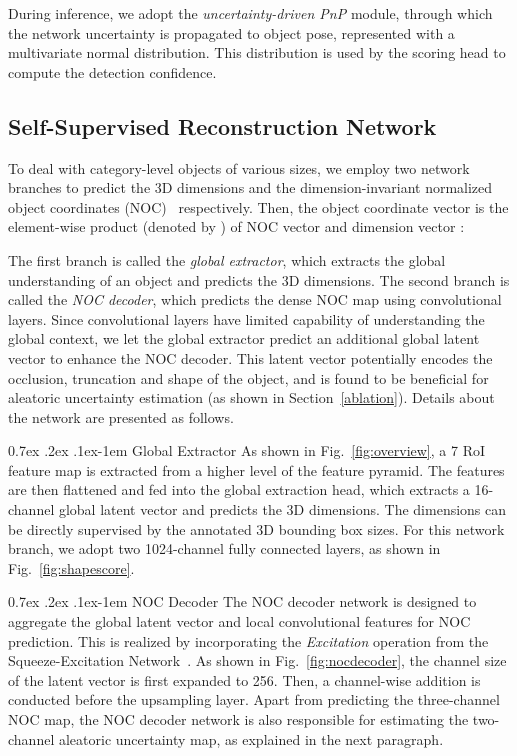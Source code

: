 \documentclass[10pt,twocolumn,letterpaper]{article}
\makeatletter
\renewcommand{\paragraph}{
  \@startsection{paragraph}{4}
  {\z@}{0.7ex \@plus .2ex \@minus .1ex}{-1em}
  {\normalfont\normalsize\bfseries}
}
\makeatother
\begin{document}
During inference, we adopt the \textit{uncertainty-driven PnP} module, through which the network uncertainty is propagated to object pose, represented with a multivariate normal distribution. This distribution is used by the scoring head to compute the detection confidence.

\subsection{Self-Supervised Reconstruction Network}

To deal with category-level objects of various sizes, we employ two network branches to predict the 3D dimensions and the dimension-invariant normalized object coordinates (NOC)~\cite{NOCS} respectively. Then, the object coordinate vector  is the element-wise product (denoted by ) of NOC vector  and dimension vector :

The first branch is called the \textit{global extractor}, which extracts the global understanding of an object and predicts the 3D dimensions. The second branch is called the \textit{NOC decoder}, which predicts the dense NOC map using convolutional layers. Since convolutional layers have limited capability of understanding the global context, we let the global extractor predict an additional global latent vector to enhance the NOC decoder. This latent vector potentially encodes the occlusion, truncation and shape of the object, and is found to be beneficial for aleatoric uncertainty estimation (as shown in Section~\ref{ablation}). Details about the network are presented as follows. 

\paragraph{Global Extractor} As shown in Fig.~\ref{fig:overview}, a 7 RoI feature map is extracted from a higher level of the feature pyramid. The features are then flattened and fed into the global extraction head, which extracts a 16-channel global latent vector and predicts the 3D dimensions. The dimensions can be directly supervised by the annotated 3D bounding box sizes. For this network branch, we adopt two 1024-channel fully connected layers, as shown in Fig.~\ref{fig:shapescore}.

\paragraph{NOC Decoder} The NOC decoder network is designed to aggregate the global latent vector and local convolutional features for NOC prediction. 
This is realized by incorporating the \textit{Excitation} operation from the Squeeze-Excitation Network~\cite{SENet}. As shown in Fig.~\ref{fig:nocdecoder}, the channel size of the latent vector is first expanded to 256. Then, a channel-wise addition is conducted before the upsampling layer. Apart from predicting the three-channel NOC map, the NOC decoder network is also responsible for estimating the two-channel aleatoric uncertainty map, as explained in the next paragraph.
\end{document}
